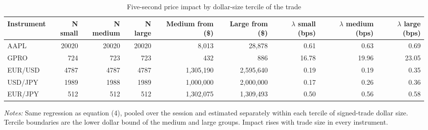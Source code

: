 \begin{table}[htbp]
\centering
\caption{Five-second price impact by dollar-size tercile of the trade}
\label{tab:impact_by_size}
\footnotesize
\begin{tabular}{lrrrrrrrr}
\toprule
Instrument & N small & N medium & N large & Medium from (\$) & Large from (\$) & $\lambda$ small (bps) & $\lambda$ medium (bps) & $\lambda$ large (bps) \\
\midrule
AAPL & 20020 & 20020 & 20020 & 8,013 & 28,878 & 0.61 & 0.63 & 0.69 \\
GPRO & 724 & 723 & 723 & 432 & 886 & 16.78 & 19.96 & 23.05 \\
EUR/USD & 4787 & 4787 & 4787 & 1,305,190 & 2,595,640 & 0.19 & 0.19 & 0.35 \\
USD/JPY & 1989 & 1988 & 1989 & 1,000,000 & 2,000,000 & 0.17 & 0.26 & 0.36 \\
EUR/JPY & 512 & 512 & 512 & 1,302,075 & 1,309,493 & 0.50 & 0.56 & 0.58 \\
\bottomrule
\end{tabular}

\begin{minipage}{0.95\linewidth}\footnotesize\emph{Notes:} Same regression as equation (4), pooled over the session and estimated separately within each tercile of signed-trade dollar size. Tercile boundaries are the lower dollar bound of the medium and large groups. Impact rises with trade size in every instrument.\end{minipage}
\end{table}

